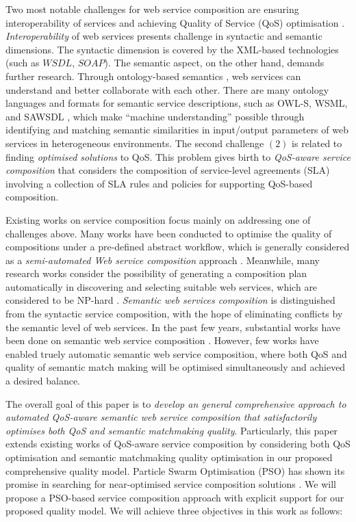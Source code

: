 \documentclass{IEEEtran}
\begin{document}
Two most notable challenges for web service composition are ensuring interoperability of services and achieving Quality of Service (QoS) optimisation \cite{fensel2011semantic}. \textit{Interoperability} of web services presents challenge in syntactic and semantic dimensions. The syntactic dimension is covered by the XML-based technologies (such as $WSDL$, $SOAP$). The semantic aspect, on the other hand, demands further research. Through ontology-based semantics \cite{o2005review}, web services can understand and better collaborate with each other. There are many ontology languages and formats for semantic service descriptions, such as OWL-S, WSML, and SAWSDL \cite{petrie2016web}, which make ``machine understanding'' possible through identifying and matching semantic similarities in input/output parameters of web services in heterogeneous environments. The second challenge $(2)$ is related to finding \textit{optimised solutions} to QoS. This problem gives birth to \textit{QoS-aware service composition} that considers the composition of service-level agreements (SLA) \cite {sahai2002automated} involving a collection of SLA rules and policies for supporting QoS-based composition.

Existing works on service composition focus mainly on addressing one of challenges above. Many works have been conducted to optimise the quality of compositions under a pre-defined abstract workflow, which is generally considered as a \textit{semi-automated Web service composition} approach \cite{parejo2008qos,bahadori2009optimal}. Meanwhile, many research works consider the possibility of generating a composition plan automatically in discovering and selecting suitable web services, which are considered to be NP-hard \cite{moghaddam2014service}. \textit{Semantic web services composition} is distinguished from the syntactic service composition, with the hope of eliminating conflicts by the semantic level of web services. In the past few years, substantial works have been done on semantic web service composition \cite{boustil2014semantic, mier2015integrated, bansal2016generalized}. However, few works have enabled truely automatic semantic web service composition, where both QoS and quality of semantic match making will be optimised simultaneously and achieved a desired balance.

The overall goal of this paper is to \textit{develop an general comprehensive approach to automated QoS-aware semantic web service composition that satisfactorily optimises both QoS and semantic matchmaking quality}. Particularly, this paper extends existing works of QoS-aware service composition by considering both QoS optimisation and semantic matchmaking quality optimisation in our proposed comprehensive quality model. Particle Swarm Optimisation (PSO) has shown its promise in searching for near-optimised service composition solutions \cite{da2016particle}. We will propose a PSO-based service composition approach with explicit support for our proposed quality model. We will achieve three objectives in this work as follows:
\end{document}
